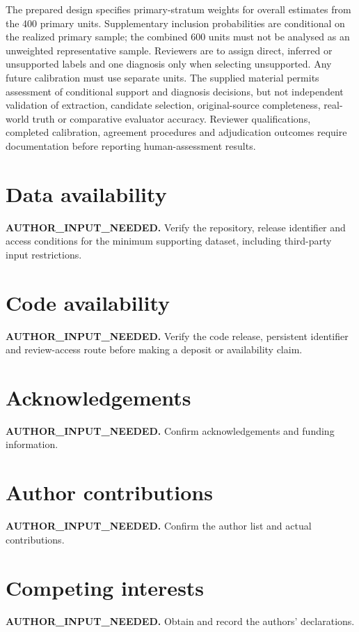\documentclass[11pt,a4paper]{article}
\begin{document}
The prepared design specifies primary-stratum weights for overall estimates from the 400 primary units. Supplementary inclusion probabilities are conditional on the realized primary sample; the combined 600 units must not be analysed as an unweighted representative sample. Reviewers are to assign direct, inferred or unsupported labels and one diagnosis only when selecting unsupported. Any future calibration must use separate units. The supplied material permits assessment of conditional support and diagnosis decisions, but not independent validation of extraction, candidate selection, original-source completeness, real-world truth or comparative evaluator accuracy. Reviewer qualifications, completed calibration, agreement procedures and adjudication outcomes require documentation before reporting human-assessment results.

\section*{Data availability}
\textbf{AUTHOR\_INPUT\_NEEDED.} Verify the repository, release identifier and access
conditions for the minimum supporting dataset, including third-party input restrictions.

\section*{Code availability}
\textbf{AUTHOR\_INPUT\_NEEDED.} Verify the code release, persistent identifier and
review-access route before making a deposit or availability claim.




\section*{Acknowledgements}
\textbf{AUTHOR\_INPUT\_NEEDED.} Confirm acknowledgements and funding information.

\section*{Author contributions}
\textbf{AUTHOR\_INPUT\_NEEDED.} Confirm the author list and actual contributions.

\section*{Competing interests}
\textbf{AUTHOR\_INPUT\_NEEDED.} Obtain and record the authors' declarations.
\end{document}
